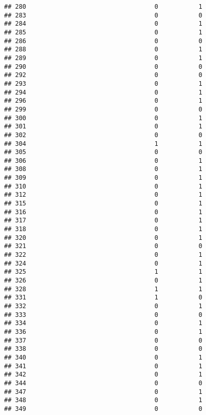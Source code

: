 \documentclass[
]{article}
\begin{document}
\begin{verbatim}
## 280                                   0           1
## 283                                   0           0
## 284                                   0           1
## 285                                   0           1
## 286                                   0           0
## 288                                   0           1
## 289                                   0           1
## 290                                   0           0
## 292                                   0           0
## 293                                   0           1
## 294                                   0           1
## 296                                   0           1
## 299                                   0           0
## 300                                   0           1
## 301                                   0           1
## 302                                   0           0
## 304                                   1           1
## 305                                   0           0
## 306                                   0           1
## 308                                   0           1
## 309                                   0           1
## 310                                   0           1
## 312                                   0           1
## 315                                   0           1
## 316                                   0           1
## 317                                   0           1
## 318                                   0           1
## 320                                   0           1
## 321                                   0           0
## 322                                   0           1
## 324                                   0           1
## 325                                   1           1
## 326                                   0           1
## 328                                   1           1
## 331                                   1           0
## 332                                   0           1
## 333                                   0           0
## 334                                   0           1
## 336                                   0           1
## 337                                   0           0
## 338                                   0           0
## 340                                   0           1
## 341                                   0           1
## 342                                   0           1
## 344                                   0           0
## 347                                   0           1
## 348                                   0           1
## 349                                   0           0

\end{verbatim}
\end{document}
